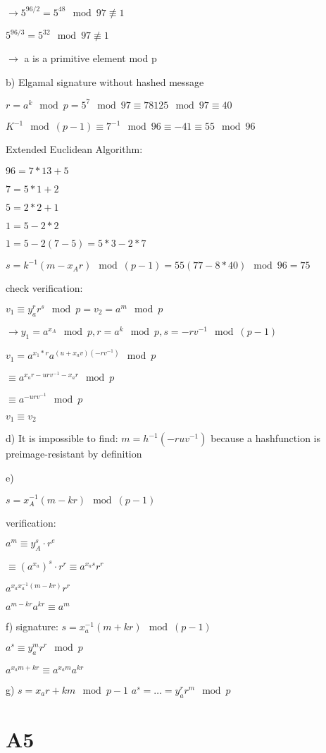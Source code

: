 \documentclass[a4paper]{article}
\begin{document}
$\rightarrow 5^{96/2} = 5^{48} \mod 97 \nequiv 1$

$5^{96/3} = 5^{32} \mod 97 \nequiv 1$

$\rightarrow$ a is a primitive element mod p

b) Elgamal signature without hashed message

$r=a^k \mod p = 5^7 \mod 97 \equiv 78125 \mod 97 \equiv 40$

$K^{-1} \mod (p-1) \equiv 7^{-1} \mod 96 \equiv -41 \equiv 55 \mod 96$

Extended Euclidean Algorithm:

$96 = 7*13+5$

$7=5*1 +2 $

$5 = 2*2 +1 $

$ 1= 5-2*2$

$1=5-2(7-5)=5*3-2*7$

$s=k^{-1}(m-x_A r) \mod (p-1) = 55 (77-8*40) \mod 96 = 75$

check verification:

$v_1 \equiv y_a^r r^s \mod p = v_2 = a^m \mod p$

$\rightarrow y_1 = a^{x_A}\mod p,r=a^k \mod p, s=-rv^{-1}\mod (p-1)$

$v_1 = a^{x_1*r}a^{(u+x_av)(-rv^{-1})}\mod p$

$\equiv a^{x_ar-urv^{-1}-x_ar}\mod p$

$\equiv a^{-urv^{-1}}\mod p$

$v_1 \equiv v_2$

d) It is impossible to find: $m=h^{-1}(-ruv^{-1})$ because a hashfunction is preimage-resistant by definition

e)

$s=x_A^{-1}(m-kr) \mod (p-1)$

verification:

$a^m \equiv y_A^s \cdot r^e$

$\equiv (a^{x_a})^{s} \cdot r^r \equiv a^{x_as}r^r$

$a^{x_ax_a^{-1}(m-kr)}r^r$

$a^{m-kr}a^{kr}\equiv a^m$

f) signature: $s= x_a^{-1}(m+kr) \mod (p-1)$

$a^s \equiv y_a^m r^r \mod p$

$a^{x_am+kr} \equiv a^{x_am}a^{kr}$

g) $s=x_ar+km \mod p-1$
$a^s = \dots = y_a^r r^m \mod p$




\section{A5} 
\end{document}
